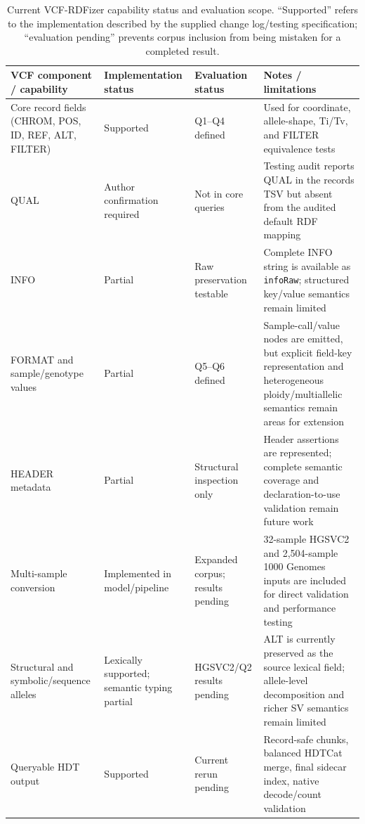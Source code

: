 \documentclass[pdflatex,sn-mathphys-num]{sn-jnl}%
\newenvironment{revision}{\begingroup\color{revisionblue}}{\endgroup}%
\theoremstyle{thmstyleone}%
\theoremstyle{thmstyletwo}%
\theoremstyle{thmstylethree}%
\begin{document}
\begin{revision}
\begin{table}[t]
\caption{Current VCF-RDFizer capability status and evaluation scope. ``Supported'' refers to the implementation described by the supplied change log/testing specification; ``evaluation pending'' prevents corpus inclusion from being mistaken for a completed result.}\label{tab:capabilities-summary}%
\centering
\scriptsize
\setlength{\tabcolsep}{3pt}
\renewcommand{\arraystretch}{0.96}
\begin{tabularx}{\textwidth}{@{}p{}p{}p{}X@{}}
\toprule
\textbf{VCF component / capability} & \textbf{Implementation status} & \textbf{Evaluation status} & \textbf{Notes / limitations} \\
\midrule
Core record fields (CHROM, POS, ID, REF, ALT, FILTER) & Supported & Q1--Q4 defined & Used for coordinate, allele-shape, Ti/Tv, and FILTER equivalence tests \\
QUAL & Author confirmation required & Not in core queries & Testing audit reports QUAL in the records TSV but absent from the audited default RDF mapping \\
INFO & Partial & Raw preservation testable & Complete INFO string is available as \texttt{infoRaw}; structured key/value semantics remain limited \\
FORMAT and sample/genotype values & Partial & Q5--Q6 defined & Sample-call/value nodes are emitted, but explicit field-key representation and heterogeneous ploidy/multiallelic semantics remain areas for extension \\
HEADER metadata & Partial & Structural inspection only & Header assertions are represented; complete semantic coverage and declaration-to-use validation remain future work \\
Multi-sample conversion & Implemented in model/pipeline & Expanded corpus; results pending & 32-sample HGSVC2 and 2,504-sample 1000 Genomes inputs are included for direct validation and performance testing \\
Structural and symbolic/sequence alleles & Lexically supported; semantic typing partial & HGSVC2/Q2 results pending & ALT is currently preserved as the source lexical field; allele-level decomposition and richer SV semantics remain limited \\
Queryable HDT output & Supported & Current rerun pending & Record-safe chunks, balanced HDTCat merge, final sidecar index, native decode/count validation \\

\end{tabularx}
\end{table}
\end{revision}
\end{document}
